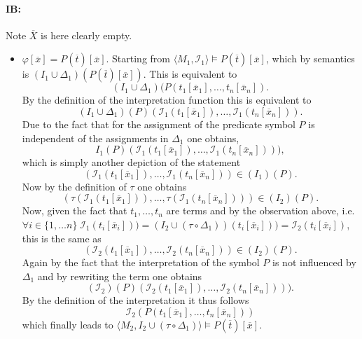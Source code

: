 \documentclass[11pt,a4paper]{article}
\begin{document}
\paragraph*{IB:}
Note $\overline{X}$ is here clearly empty.
\begin{itemize}[leftmargin=*]
\item $\varphi[\overline{x}]= P(\overline{t})[\overline{x}]$. Starting from $\langle M_1, \mathcal{I}_1 \rangle \models P(\overline{t})[\overline{x}] $, which by semantics is $(I_1 \cup \Delta_1)(P(\overline{t})[\overline{x}])$. This is equivalent to 
\begin{equation*}
(I_1 \cup \Delta_1)(P(t_1[\overline{x}_1], \dots , t_n[\overline{x}_n]).
\end{equation*}
By the definition of the interpretation function this is equivalent to 
\begin{equation*}
(I_1 \cup \Delta_1)(P)(\mathcal{I}_1(t_1[\overline{x}_1]), \dots , \mathcal{I}_1(t_n[\overline{x}_n])).
\end{equation*}
Due to the fact that for the assignment of the predicate symbol $P$ is independent of the assignments in $\Delta_1$ one obtains,
\begin{equation*}
I_1(P)(\mathcal{I}_1(t_1[\overline{x}_1]), \dots , \mathcal{I}_1(t_n[\overline{x}_n]))),
\end{equation*}
which is simply another depiction of the statement
\begin{equation*}
(\mathcal{I}_1(t_1[\overline{x}_1]), \dots , \mathcal{I}_1(t_n[\overline{x}_n])) \in (I_1)(P).
\end{equation*}
Now by the definition of $\tau$ one obtains 
\begin{equation*}
(\tau(\mathcal{I}_1(t_1[\overline{x}_1])), \dots , \tau(\mathcal{I}_1(t_n[\overline{x}_n]))) \in (I_2)(P).
\end{equation*}
Now, given the fact that $t_1, \dots , t_n$ are terms and by the observation above, i.e. $\forall i \in \{1,\dots n\}\; \mathcal{I}_1(t_i[\overline{x}_i])) = (I_2 \cup (\tau \circ \Delta_1))(t_i[\overline{x}_i])) = \mathcal{I}_2(t_i[\overline{x}_i])$, this is the same as 
\begin{equation*}
(\mathcal{I}_2(t_1[\overline{x}_1]), \dots , \mathcal{I}_2(t_n[\overline{x}_n])) \in (I_2)(P).
\end{equation*}
Again by the fact that the interpretation of the symbol $P$ is not influenced by $\Delta_1$ and by rewriting the term one obtains  
\begin{equation*}
(\mathcal{I}_2)(P)(\mathcal{I}_2(t_1[\overline{x}_1]), \dots , \mathcal{I}_2(t_n[\overline{x}_n]))).
\end{equation*}
By the definition of the interpretation it thus follows 
\begin{equation*}
\mathcal{I}_2(P(t_1[\overline{x}_1], \dots , t_n[\overline{x}_n]))
\end{equation*}
which finally leads to $\langle M_2, I_2 \cup (\tau \circ \Delta_1) \rangle \models  P(\overline{t})[\overline{x}]$.\\


\end{itemize}
\end{document}
